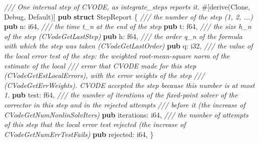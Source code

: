 \documentclass[
  10pt,
]{article}
\newenvironment{Shaded}{}{}
\newcommand{\AttributeTok}[1]{\textcolor[rgb]{0.49,0.56,0.16}{#1}}
\newcommand{\BuiltInTok}[1]{\textcolor[rgb]{0.00,0.50,0.00}{#1}}
\newcommand{\CommentTok}[1]{\textcolor[rgb]{0.38,0.63,0.69}{\textit{#1}}}
\newcommand{\DataTypeTok}[1]{\textcolor[rgb]{0.56,0.13,0.00}{#1}}
\newcommand{\KeywordTok}[1]{\textcolor[rgb]{0.00,0.44,0.13}{\textbf{#1}}}
\newcommand{\NormalTok}[1]{#1}
\newcommand{\OperatorTok}[1]{\textcolor[rgb]{0.40,0.40,0.40}{#1}}
\begin{document}
\begin{Shaded}
\begin{Highlighting}[]
\CommentTok{/// One internal step of CVODE, as \textasciigrave{}integrate\_steps\textasciigrave{} reports it.}
\AttributeTok{\#[}\NormalTok{derive}\AttributeTok{(}\BuiltInTok{Clone}\OperatorTok{,} \BuiltInTok{Debug}\OperatorTok{,} \BuiltInTok{Default}\AttributeTok{)]}
\KeywordTok{pub} \KeywordTok{struct}\NormalTok{ StepReport }\OperatorTok{\{}
    \CommentTok{/// the number of the step (1, 2, ...)}
    \KeywordTok{pub}\NormalTok{ n}\OperatorTok{:} \DataTypeTok{i64}\OperatorTok{,}
    \CommentTok{/// the time t\_n at the end of the step}
    \KeywordTok{pub}\NormalTok{ t}\OperatorTok{:} \DataTypeTok{f64}\OperatorTok{,}
    \CommentTok{/// the size h\_n of the step (CVodeGetLastStep)}
    \KeywordTok{pub}\NormalTok{ h}\OperatorTok{:} \DataTypeTok{f64}\OperatorTok{,}
    \CommentTok{/// the order q\_n of the formula with which the step was taken (CVodeGetLastOrder)}
    \KeywordTok{pub}\NormalTok{ q}\OperatorTok{:} \DataTypeTok{i32}\OperatorTok{,}
    \CommentTok{/// the value of the local error test of the step: the weighted root{-}mean{-}square norm of the estimate of the local}
    \CommentTok{/// error that CVODE made for this step (CVodeGetEstLocalErrors), with the error weights of the step}
    \CommentTok{/// (CVodeGetErrWeights).  CVODE accepted the step because this number is at most 1.}
    \KeywordTok{pub}\NormalTok{ test}\OperatorTok{:} \DataTypeTok{f64}\OperatorTok{,}
    \CommentTok{/// the number of iterations of the fixed{-}point solver of the corrector in this step and in the rejected attempts}
    \CommentTok{/// before it (the increase of CVodeGetNumNonlinSolvIters)}
    \KeywordTok{pub}\NormalTok{ iterations}\OperatorTok{:} \DataTypeTok{i64}\OperatorTok{,}
    \CommentTok{/// the number of attempts of this step that the local error test rejected (the increase of CVodeGetNumErrTestFails)}
    \KeywordTok{pub}\NormalTok{ rejected}\OperatorTok{:} \DataTypeTok{i64}\OperatorTok{,}
\OperatorTok{\}}


\end{Highlighting}
\end{Shaded}
\end{document}
